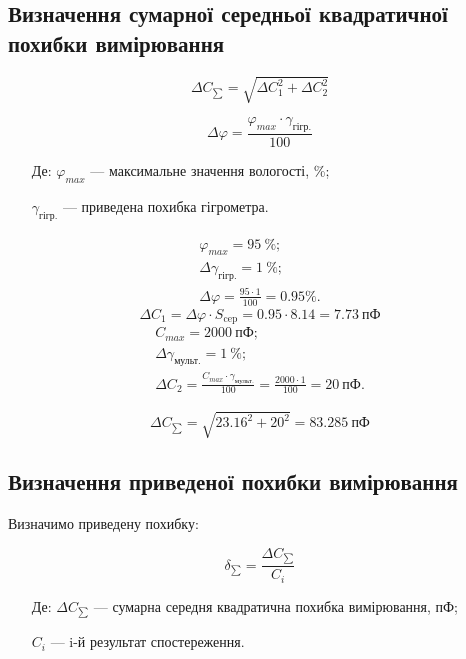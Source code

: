 \subsection{Визначення сумарної середньої квадратичної похибки вимірювання}

\begin{equation}
  \Delta C_{\sum} = \sqrt{\Delta C_1^2 + \Delta C_2^2}
\end{equation}

\begin{equation}
  \Delta \varphi = \frac{\varphi_{max} \cdot \gamma_{\text{гігр.}} }{100}
\end{equation}
\begin{itemize}
\item [Де:] $\varphi_{max}$ --- максимальне значення вологості, \%;
\item []$\gamma_{\text{гігр.}}$ ---  приведена похибка гігрометра.
\end{itemize}

\begin{gather}
  \varphi_{max} = 95 ~\%; \nonumber\\
  \Delta \gamma_{\text{гігр.}} = 1 ~\%; \\
  \Delta \varphi = \frac{95 \cdot 1}{100} = 0.95 \%. \nonumber
\end{gather}
\begin{equation}
    \Delta C_1 = \Delta \varphi \cdot S_{\text{cep}} = 0.95 \cdot 8.14 = 7.73 ~\text{пФ}
\end{equation}
\begin{gather}
    C_{max} = 2000 ~\text{пФ}; \nonumber\\
    \Delta \gamma_{\text{мульт.}} = 1 ~\%; \\
    \Delta C_2 = \frac{C_{max} \cdot \gamma_{\text{мульт.}}}{100} = \frac{2000 \cdot 1}{100} = 20 ~\text{пФ}. \nonumber
\end{gather}

\begin{equation}
  \Delta C_{\sum}  = \sqrt{23.16^2 + 20^2} = 83.285 ~\text{пФ}
\end{equation}

\subsection{Визначення приведеної похибки вимірювання}
Визначимо приведену похибку:

\begin{equation}
    \delta_{\sum} = \frac{\Delta C_{\sum}}{C_i}
\end{equation}
\begin{itemize}
\item [Де:] $\Delta C_{\sum}$ --- сумарна середня квадратична похибка вимірювання, пФ;
\item []$C_i$ ---  i-й результат спостереження.
\end{itemize}


